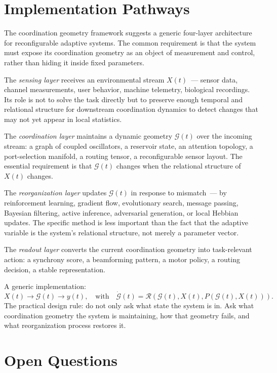 \documentclass[11pt, a4paper]{article}
\theoremstyle{definition}
\theoremstyle{remark}
\begin{document}
\section{Implementation Pathways}

The coordination geometry framework suggests a generic four-layer
architecture for reconfigurable adaptive systems. The common requirement
is that the system must expose its coordination geometry as an object of
measurement and control, rather than hiding it inside fixed parameters.

The \textit{sensing layer} receives an environmental stream $X(t)$~---
sensor data, channel measurements, user behavior, machine telemetry,
biological recordings. Its role is not to solve the task directly but to
preserve enough temporal and relational structure for downstream coordination
dynamics to detect changes that may not yet appear in local statistics.

The \textit{coordination layer} maintains a dynamic geometry $\mathcal{G}(t)$
over the incoming stream: a graph of coupled oscillators, a reservoir state,
an attention topology, a port-selection manifold, a routing tensor, a
reconfigurable sensor layout. The essential requirement is that
$\mathcal{G}(t)$ changes when the relational structure of $X(t)$ changes.

The \textit{reorganization layer} updates $\mathcal{G}(t)$ in response to
mismatch~--- by reinforcement learning, gradient flow, evolutionary search,
message passing, Bayesian filtering, active inference, adversarial generation,
or local Hebbian updates. The specific method is less important than the
fact that the adaptive variable is the system's relational structure, not
merely a parameter vector.

The \textit{readout layer} converts the current coordination geometry into
task-relevant action: a synchrony score, a beamforming pattern, a motor
policy, a routing decision, a stable representation.

A generic implementation:
\[
X(t) \longrightarrow \mathcal{G}(t) \longrightarrow y(t),
\quad\text{with}\quad
\dot{\mathcal{G}}(t) = \mathcal{R}\!\left(\mathcal{G}(t), X(t), P(\mathcal{G}(t),X(t))\right).
\]
The practical design rule: do not only ask what state the system is in. Ask
what coordination geometry the system is maintaining, how that geometry
fails, and what reorganization process restores it.

\section{Open Questions}
\end{document}
